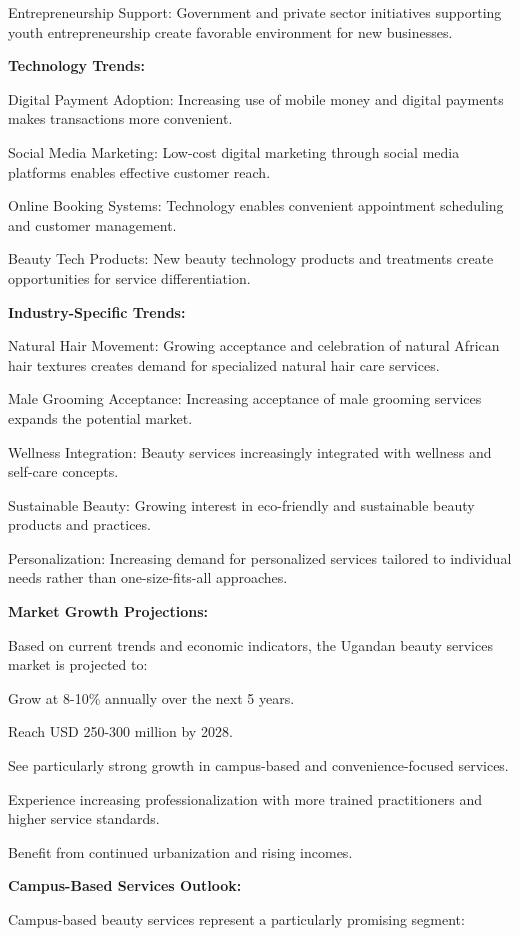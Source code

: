 \documentclass[a4paper,12pt]{article}
\begin{document}
Entrepreneurship Support: Government and private sector initiatives supporting youth entrepreneurship create favorable environment for new businesses.

\textbf{Technology Trends:}

Digital Payment Adoption: Increasing use of mobile money and digital payments makes transactions more convenient.

Social Media Marketing: Low-cost digital marketing through social media platforms enables effective customer reach.

Online Booking Systems: Technology enables convenient appointment scheduling and customer management.

Beauty Tech Products: New beauty technology products and treatments create opportunities for service differentiation.

\textbf{Industry-Specific Trends:}

Natural Hair Movement: Growing acceptance and celebration of natural African hair textures creates demand for specialized natural hair care services.

Male Grooming Acceptance: Increasing acceptance of male grooming services expands the potential market.

Wellness Integration: Beauty services increasingly integrated with wellness and self-care concepts.

Sustainable Beauty: Growing interest in eco-friendly and sustainable beauty products and practices.

Personalization: Increasing demand for personalized services tailored to individual needs rather than one-size-fits-all approaches.

\textbf{Market Growth Projections:}

Based on current trends and economic indicators, the Ugandan beauty services market is projected to:

Grow at 8-10\% annually over the next 5 years.

Reach USD 250-300 million by 2028.

See particularly strong growth in campus-based and convenience-focused services.

Experience increasing professionalization with more trained practitioners and higher service standards.

Benefit from continued urbanization and rising incomes.

\textbf{Campus-Based Services Outlook:}

Campus-based beauty services represent a particularly promising segment:
\end{document}
